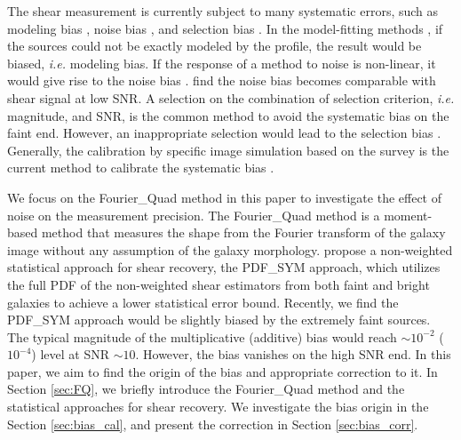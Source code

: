 \documentclass[twocolumn]{aastex62}
\def\ie{{\it i.e. }}
\begin{document}
The shear measurement is currently subject to many systematic errors, such as modeling bias \citep{Bernstein2010,Voigt2010,Kacprzak2014}, noise bias \citep{Refregier2012,Kacprzak2014}, and selection bias \citep{Hirata2003}. In the model-fitting methods \citep{Miller2013, Zuntz2013}, if the sources could not be exactly modeled by the profile, the result would be biased, \ie modeling bias. If the response of a method to noise is non-linear, it would give rise to the noise bias \citep{Refregier2012, Viola2014, Berstein2016}. \cite{Refregier2012} find the noise bias becomes comparable with shear signal at low SNR. A selection on the combination of selection criterion, \ie magnitude, and SNR, is the common method to avoid the systematic bias on the faint end. However, an inappropriate selection would lead to the selection bias \citep{Hirata2003, Li2020}. Generally, the calibration by specific image simulation based on the survey is the current method to calibrate the systematic bias \citep{Kitching2008, Miller2013, Fenech2017}.

We focus on the Fourier\_Quad method\citep{Zhang2008, Zhang2015} in this paper to investigate the effect of noise on the measurement precision. The Fourier\_Quad method is a moment-based method that measures the shape from the Fourier transform of the galaxy image without any assumption of the galaxy morphology. \cite{Zhang2017} propose a non-weighted statistical approach for shear recovery, the PDF\_SYM approach, which utilizes the full PDF of the non-weighted shear estimators from both faint and bright galaxies to achieve a lower statistical error bound. Recently, we find the PDF\_SYM approach would be slightly biased by the extremely faint sources. The typical magnitude of the multiplicative (additive) bias would reach $\sim 10^{-2}$ ($10^{-4}$) level at SNR $\sim 10$. However, the bias vanishes on the high SNR end. In this paper, we aim to find the origin of the bias and appropriate correction to it. In Section \ref{sec:FQ}, we briefly introduce the Fourier\_Quad method and the statistical approaches for shear recovery. We investigate the bias origin in the Section \ref{sec:bias_cal}, and present the correction in Section \ref{sec:bias_corr}.

\end{document}
